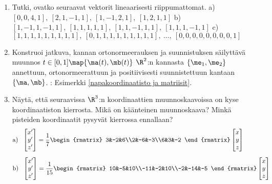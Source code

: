 \begin{enumerate}
\item
Tutki, ovatko seuraavat vektorit lineaarisesti riippumattomat.
\vspace{1mm}\newline
a) \ $[0,0,4,1],\ [2,1,-1,1],\ [1,-1,2,1],\ [1,2,1,1]$ \newline
b) \ $[1,-1,1,-1,1],\ [1,1,1,1,1],\ [1,1,-1,1,1],\ [1,1,1,-1,1]$ \newline
c) \ $[1,1,1,1,1,1,1,1,1],\ [0,1,1,1,1,1,1,1,1,1],\ \ldots,\ [0,0,0,0,0,0,0,0,1]$

\item \label{H-m-6: jatkuva kierto tasossa}
Konstruoi jatkuva, kannan ortonormeerauksen ja suunnistuksen säilyttävä muunnos
$t\in[0,1]\map\{\ma(t),\mb(t)\}$ $\R^2$:n kannasta $\{\me_1,\me_2\}$ annettuun,
ortonormeerattuun ja positiivisesti suunnistettuun kantaan $\{\ma,\mb\}$. \newline
{}: Esimerkki \ref{napakoordinaatisto ja matriisit}.

\item \label{H-m-6: kiertoja}
Näytä, että seuraavissa $\R^3$:n koordinaattien muunnoskaavoissa on kyse koordinaatiston
kierrosta. Mikä on käänteinen muunnoskaava? Minkä pisteiden koordinaatit pysyvät kierrossa
ennallaan?
\begin{align*}
&\text{a)}\ \ \begin{bmatrix} x'\\y'\\z' \end{bmatrix} =
              \frac{1}{7} \begin{rmatrix} 3&-2&6\\2&-6&-3\\6&3&-2 \end{rmatrix}
              \begin{bmatrix} x\\y\\z \end{bmatrix} \\[2mm]
&\text{b)}\ \ \begin{bmatrix} x'\\y'\\z' \end{bmatrix} =
              \frac{1}{15} \begin{rmatrix} 10&-5&10\\-11&-2&10\\-2&-14&-5 \end{rmatrix}
              \begin{bmatrix} x\\y\\z \end{bmatrix}
\end{align*}


\end{enumerate}

